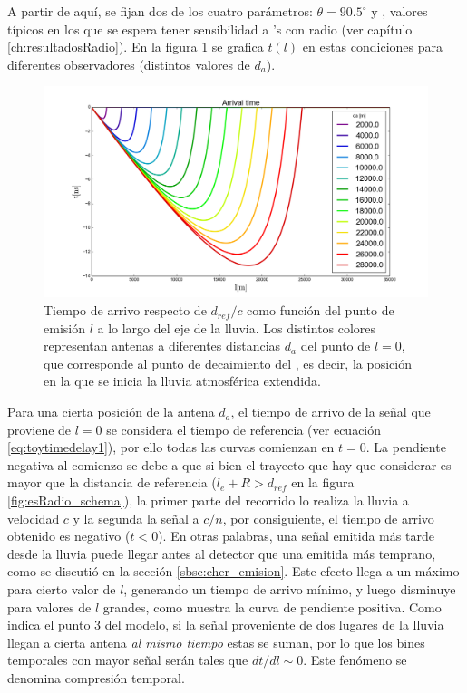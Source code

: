 	A partir de aquí, se fijan dos de los cuatro parámetros: $\theta=90.5^\circ$ y , valores t\'ipicos en los que se espera tener sensibilidad a \nutau{}'s con radio (ver cap\'itulo \ref{ch:resultadosRadio}).
	En la figura \ref{fig:timeDelay_at} se grafica $t(l)$ en estas condiciones para diferentes observadores (distintos valores de $d_a$).
	\begin{figure}[ht!]
		\centering
		\includegraphics[width=\textwidth]{./fig/EASRadio/timeDelay_at}
		\caption{\label{fig:timeDelay_at}
		Tiempo de arrivo respecto de $d_{ref}/c$ como funci\'on del punto de emisi\'on $l$ a lo largo del eje de la lluvia. Los distintos colores representan antenas a diferentes distancias $d_a$ del punto de $l=0$, que corresponde al punto de decaimiento del \tauon{}, es decir, la posici\'on en la que se inicia la lluvia atmosf\'erica extendida.
		}
	\end{figure}
	Para una cierta posición de la antena $d_a$, el tiempo de arrivo de la se\~nal que proviene de $l=0$ se considera el tiempo de referencia (ver ecuaci\'on \ref{eq:toytimedelay1}), por ello todas las curvas comienzan en $t=0$.
	La pendiente negativa al comienzo se debe a que si bien el trayecto que hay que considerar es mayor que la distancia de referencia ($l_e+R>d_{ref}$ en la figura \ref{fig:esRadio_schema}), la primer parte del recorrido lo realiza la lluvia a velocidad $c$ y la segunda la señal a $c/n$,  por consiguiente, el tiempo de arrivo obtenido es negativo ($t<0$).
	En otras palabras, una se\~nal emitida m\'as tarde desde la lluvia puede llegar antes al detector que una emitida m\'as temprano, como se discuti\'o en la secci\'on \ref{sbsc:cher_emision}.
	Este efecto llega a un máximo para cierto valor de $l$, generando un tiempo de arrivo mínimo, y luego disminuye para valores de $l$ grandes, como muestra la curva de pendiente positiva.
	Como indica el punto 3 del modelo, si la señal proveniente de dos lugares de la lluvia llegan a cierta antena \emph{al mismo tiempo} estas se suman, por lo que los bines temporales con mayor señal serán tales que $dt/dl\sim0$. Este fen\'omeno se denomina compresi\'on temporal.
	
